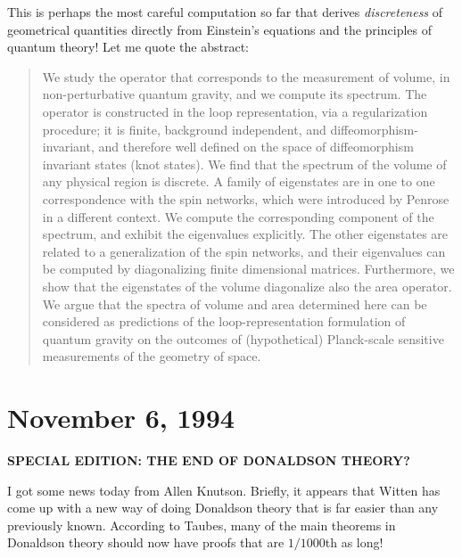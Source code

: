 \documentclass[12pt]{article}
\def\tightlist{}
\renewcommand{\texttt}[1]{%
  \begingroup
  \ttfamily
  \begingroup\lccode`~=`/\lowercase{\endgroup\def~}{/\discretionary{}{}{}}%
  \begingroup\lccode`~=`[\lowercase{\endgroup\def~}{[\discretionary{}{}{}}%
  \begingroup\lccode`~=`.\lowercase{\endgroup\def~}{.\discretionary{}{}{}}%
  \catcode`/=\active\catcode`[=\active\catcode`.=\active
  \scantokens{#1\noexpand}%
  \endgroup
}
\begin{document}
\noindent
This is perhaps the most careful computation so far that derives
\emph{discreteness} of geometrical quantities directly from Einstein's
equations and the principles of quantum theory! Let me quote the
abstract:

\begin{quote}
We study the operator that corresponds to the measurement of volume, in
non-perturbative quantum gravity, and we compute its spectrum. The
operator is constructed in the loop representation, via a regularization
procedure; it is finite, background independent, and
diffeomorphism-invariant, and therefore well defined on the space of
diffeomorphism invariant states (knot states). We find that the spectrum
of the volume of any physical region is discrete. A family of
eigenstates are in one to one correspondence with the spin networks,
which were introduced by Penrose in a different context. We compute the
corresponding component of the spectrum, and exhibit the eigenvalues
explicitly. The other eigenstates are related to a generalization of the
spin networks, and their eigenvalues can be computed by diagonalizing
finite dimensional matrices. Furthermore, we show that the eigenstates
of the volume diagonalize also the area operator. We argue that the
spectra of volume and area determined here can be considered as
predictions of the loop-representation formulation of quantum gravity on
the outcomes of (hypothetical) Planck-scale sensitive measurements of
the geometry of space.
\end{quote}



\hypertarget{week44}{%
\section{November 6, 1994}\label{week44}}

\begin{center}
\textbf{SPECIAL EDITION: THE END OF DONALDSON THEORY?}
\end{center}

I got some news today from Allen Knutson. Briefly, it appears that
Witten has come up with a new way of doing Donaldson theory that is far
easier than any previously known. According to Taubes, many of the main
theorems in Donaldson theory should now have proofs that are
\(1/1000\)th as long!
\end{document}
